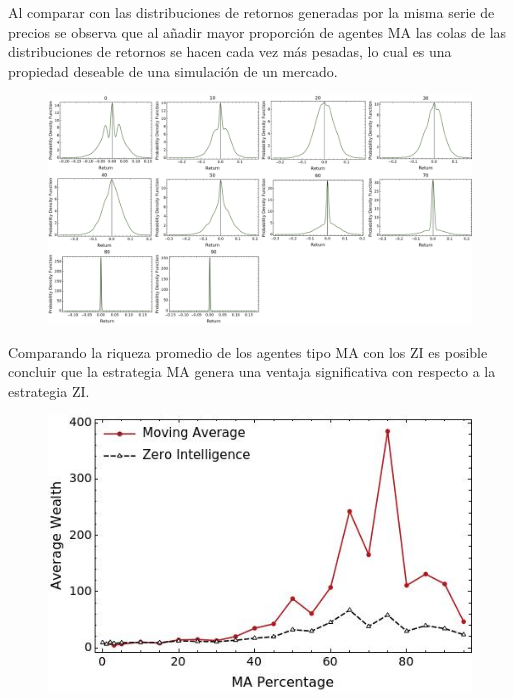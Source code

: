 \markdownRendererInterblockSeparator
{}Al comparar con las distribuciones de retornos generadas por la misma serie de precios se observa que al añadir mayor proporción de agentes MA las colas de las distribuciones de retornos se hacen cada vez más pesadas, lo cual es una propiedad deseable de una simulación de un mercado.\markdownRendererInterblockSeparator
{}\begin{figure}[h!] \centering \includegraphics[scale=0.2]{img/dist_prices.png} \end{figure}\markdownRendererInterblockSeparator
{}\markdownRendererHorizontalRule{}\markdownRendererInterblockSeparator
{}\markdownRendererInterblockSeparator
{}Comparando la riqueza promedio de los agentes tipo MA con los ZI es posible concluir que la estrategia MA genera una ventaja significativa con respecto a la estrategia ZI.\markdownRendererInterblockSeparator
{}\begin{figure}[h!] \centering \includegraphics[scale=0.2]{img/wealth_comparison.jpeg} \end{figure}\markdownRendererInterblockSeparator
{}\markdownRendererHorizontalRule{}\relax